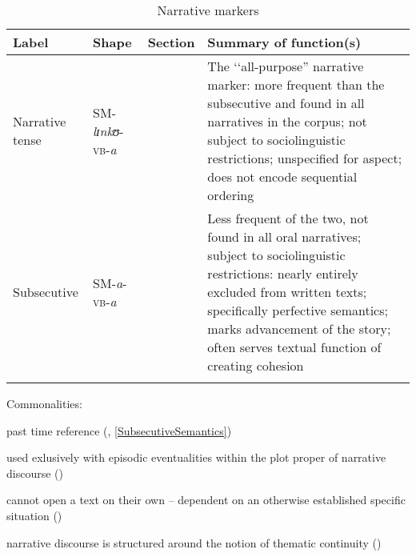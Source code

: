 \begin{sidewaystable}
	\begin{tabularx}{\textwidth}{lllX}
	\lsptoprule
	\footnotesize{Label} & \footnotesize{Shape} & \footnotesize{Section} & \footnotesize{Summary of function(s)}\\
	\midrule
	Narrative tense & SM-\textit{lɪnkʊ}-\textsc{vb}-\textit{a} & \sectref{NarrativeTense} & The \lq\lq all-purpose'' narrative marker: more frequent than the subsecutive and found in all narratives in the corpus; not subject to sociolinguistic restrictions; unspecified for aspect; does not encode sequential ordering\\
	Subsecutive & SM-\textit{a}-\textsc{vb}-\textit{a} & \sectref{Subsecutive} & Less frequent of the two, not found in all oral narratives; subject to	sociolinguistic	restrictions: nearly entirely excluded from written texts; specifically perfective semantics; marks advancement of the story; often serves textual function of creating cohesion\\
	\lspbottomrule
	\end{tabularx}
	\caption{Narrative markers}\label{tabAppendixNarrativeMarkers}
\begin{flushleft}
	Commonalities:
	\begin{compactitem}
		\item past time reference (, \ref{SubsecutiveSemantics})
		\item used exlusively with episodic eventualities within the plot proper of narrative discourse ()
		\item cannot open a text on their own -- dependent on an otherwise established specific situation ()
		\item narrative discourse is structured around the notion of thematic continuity ()
	\end{compactitem}

\end{flushleft}
\end{sidewaystable}


